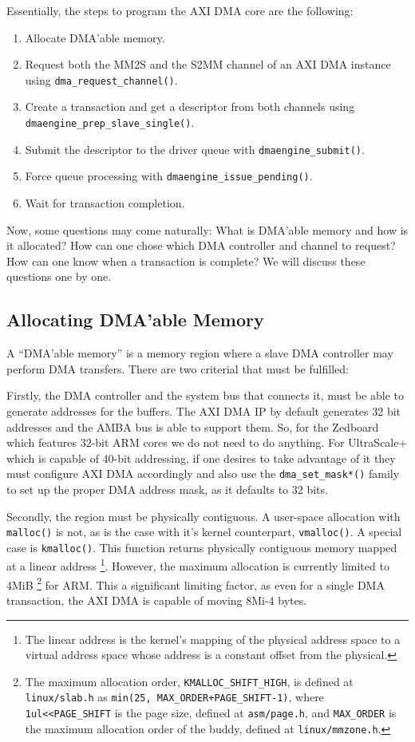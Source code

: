 Essentially, the steps to program the AXI DMA core are the following:

\begin{enumerate}
\item	Allocate DMA'able memory.
\item	Request both the MM2S and the S2MM channel of an AXI DMA instance using \texttt{dma\_request\_channel()}.
\item	Create a transaction and get a descriptor from both channels using \texttt{dmaengine\_prep\_slave\_single()}.
\item	Submit the descriptor to the driver queue with \texttt{dmaengine\_submit()}.
\item	Force queue processing with \texttt{dmaengine\_issue\_pending()}.
\item	Wait for transaction completion.
\end{enumerate}

Now, some questions may come naturally: What is DMA'able memory and how is it allocated? 
How can one chose which DMA controller and channel to request?
How can one know when a transaction is complete?
We will discuss these questions one by one.

\subsection{Allocating DMA'able Memory}
\label{sec:allocating-memory}

A ``DMA'able memory'' is a memory region where a slave DMA controller may perform DMA transfers.
There are two criterial that must be fulfilled:

Firstly, the DMA controller and the system bus that connects it, must be able to generate
addresses for the buffers. The AXI DMA IP by default generates 32 bit addresses and the AMBA bus
is able to support them. So, for the Zedboard which features 32-bit ARM cores we do not need to do anything.
For UltraScale+ which is capable of 40-bit addressing, if one desires to take advantage of it they must
configure AXI DMA accordingly and also use the \texttt{dma\_set\_mask*()} family to set up the proper
DMA address mask, as it defaults to 32 bits.

Secondly, the region must be physically contiguous. A user-space allocation with \texttt{malloc()} is not,
as is the case with it's kernel counterpart, \texttt{vmalloc()}. A special case is \texttt{kmalloc()}.
This function returns physically contiguous memory mapped at a linear address
\footnote{The linear address is the kernel's mapping of the physical address space
to a virtual address space whose address is a constant offset from the physical.}.
However, the maximum allocation is currently limited to 4MiB
\footnote{The maximum allocation order, \texttt{KMALLOC\_SHIFT\_HIGH}, is defined
at \texttt{linux/slab.h} as \texttt{min(25, MAX\_ORDER+PAGE\_SHIFT-1)},
where \texttt{1ul<<PAGE\_SHIFT} is the page size, defined at \texttt{asm/page.h},
and \texttt{MAX\_ORDER} is the maximum allocation order of the \gls{buddy}, 
defined at \texttt{linux/mmzone.h}.}
for ARM. This a significant limiting factor, as even for a single DMA transaction, the AXI DMA is
capable of moving 8Mi-4 bytes.

